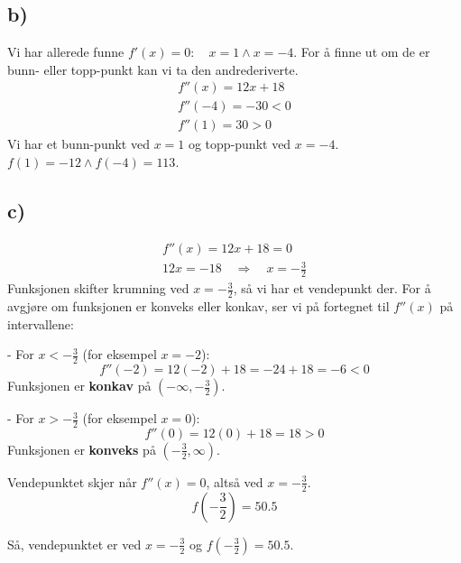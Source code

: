 \documentclass[12pt]{article}
\begin{document}
\subsection*{b)}
Vi har allerede funne \(f'(x) = 0: \quad x = 1 \land x = -4\). For å finne 
ut om de er bunn- eller topp-punkt kan vi ta den andrederiverte.
\begin{gather*} 
  f''(x)=12x + 18 \\ 
  f''(-4) = -30 < 0 \\ 
  f''(1) = 30 > 0
\end{gather*}
Vi har et bunn-punkt ved \(x=1\) og topp-punkt ved \(x = -4\). 
\(f(1) = -12 \land f(-4) = 113\).

\subsection*{c)}
\begin{gather*}
  f''(x) = 12x + 18 = 0 \\
  12x = -18 \quad \Rightarrow \quad x = -\frac{3}{2}
\end{gather*}
Funksjonen skifter krumning ved \( x = -\frac{3}{2} \), så vi har et vendepunkt der. For å avgjøre om funksjonen er konveks eller konkav, ser vi på fortegnet til \( f''(x) \) på intervallene:

- For \( x < -\frac{3}{2} \) (for eksempel \( x = -2 \)):
  \[
  f''(-2) = 12(-2) + 18 = -24 + 18 = -6 < 0
  \]
  Funksjonen er \textbf{konkav} på \( (-\infty, -\frac{3}{2}) \).

- For \( x > -\frac{3}{2} \) (for eksempel \( x = 0 \)):
  \[
  f''(0) = 12(0) + 18 = 18 > 0
  \]
  Funksjonen er \textbf{konveks} på \( (-\frac{3}{2}, \infty) \).

Vendepunktet skjer når \( f''(x) = 0 \), altså ved \( x = -\frac{3}{2} \).
\[
f\left( -\frac{3}{2} \right) = 50.5
\]

Så, vendepunktet er ved \( x = -\frac{3}{2} \) 
og \( f\left( -\frac{3}{2} \right) = 50.5 \).
\end{document}
